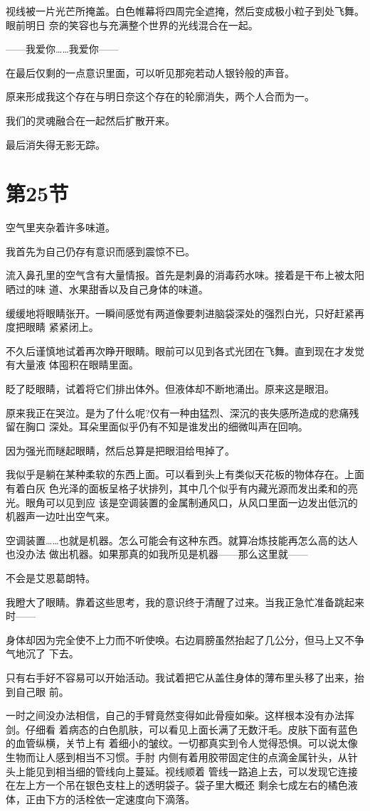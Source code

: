 \documentclass[11pt]{book}
\begin{document}
视线被一片光芒所掩盖。白色帷幕将四周完全遮掩，然后变成极小粒子到处飞舞。眼前明日
奈的笑容也与充满整个世界的光线混合在一起。

——我爱你……我爱你——

在最后仅剩的一点意识里面，可以听见那宛若动人银铃般的声音。

原来形成我这个存在与明日奈这个存在的轮廓消失，两个人合而为一。

我们的灵魂融合在一起然后扩散开来。

最后消失得无影无踪。
\section{第25节}
\label{sec:orge226f07}
空气里夹杂着许多味道。

我首先为自己仍存有意识而感到震惊不已。

流入鼻孔里的空气含有大量情报。首先是刺鼻的消毒药水味。接着是干布上被太阳晒过的味
道、水果甜香以及自己身体的味道。

缓缓地将眼睛张开。一瞬间感觉有两道像要刺进脑袋深处的强烈白光，只好赶紧再度把眼睛
紧紧闭上。

不久后谨慎地试着再次睁开眼睛。眼前可以见到各式光团在飞舞。直到现在才发觉有大量液
体囤积在眼睛里面。

眨了眨眼睛，试着将它们排出体外。但液体却不断地涌出。原来这是眼泪。

原来我正在哭泣。是为了什么呢?仅有一种由猛烈、深沉的丧失感所造成的悲痛残留在胸口
深处。耳朵里面似乎仍有不知是谁发出的细微叫声在回响。

因为强光而瞇起眼睛，然后总算是把眼泪给甩掉了。

我似乎是躺在某种柔软的东西上面。可以看到头上有类似天花板的物体存在。上面有着白灰
色光泽的面板呈格子状排列，其中几个似乎有内藏光源而发出柔和的亮光。眼角可以见到应
该是空调装置的金属制通风口，从风口里面一边发出低沉的机器声一边吐出空气来。

空调装置……也就是机器。怎么可能会有这种东西。就算冶炼技能再怎么高的达人也没办法
做出机器。如果那真的如我所见是机器——那么这里就——

不会是艾恩葛朗特。

我瞪大了眼睛。靠着这些思考，我的意识终于清醒了过来。当我正急忙准备跳起来时——

身体却因为完全使不上力而不听使唤。右边肩膀虽然抬起了几公分，但马上又不争气地沉了
下去。

只有右手好不容易可以开始活动。我试着把它从盖住身体的薄布里头移了出来，抬到自己眼
前。

一时之间没办法相信，自己的手臂竟然变得如此骨瘦如柴。这样根本没有办法挥剑。仔细看
着病态的白色肌肤，可以看见上面长满了无数汗毛。皮肤下面有蓝色的血管纵横，关节上有
着细小的皱纹。一切都真实到令人觉得恐惧。可以说太像生物而让人感到相当不习惯。手肘
内侧有着用胶带固定住的点滴金属针头，从针头上能见到相当细的管线向上蔓延。视线顺着
管线一路追上去，可以发现它连接在左上方一个吊在银色支柱上的透明袋子。袋子里大概还
剩余七成左右的橘色液体，正由下方的活栓依一定速度向下滴落。
\end{document}
